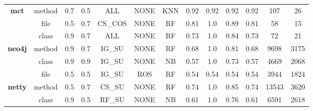 \begin{table}[H]
{\begin{tabular}{@{}ccccccccccccc@{}}
                                                         \hline
\multirow{3}{*}{\textbf{mct}}                            & method                 & 0.7        & 0.5           & ALL                      & NONE                       & KNN            & 0.92               & 0.92            & 0.92       & 0.92              & 107                & 26            \\
                                                         & file                   & 0.5        & 0.7           & CS\_COS                  & NONE                       & RF             & 0.81               & 1.0             & 0.89       & 0.81              & 58                 & 15            \\
                                                         & class                  & 0.9        & 0.7           & ALL                      & NONE                       & RF             & 0.73               & 1.0             & 0.84       & 0.73              & 72                 & 21            \\
                                                         \hline
\multirow{3}{*}{\textbf{neo4j}}                          & method                 & 0.9        & 0.7           & IG\_SU                   & NONE                       & RF             & 0.68               & 1.0             & 0.81       & 0.68              & 9698               & 3175          \\
                                                         & class                  & 0.9        & 0.9           & IG\_SU                   & NONE                       & NB             & 0.57               & 1.0             & 0.73       & 0.57              & 4669               & 2068          \\
                                                         & file                   & 0.5        & 0.5           & IG\_SU                   & ROS                        & RF             & 0.54               & 0.54            & 0.54       & 0.54              & 3944               & 1824          \\
                                                         \hline
\multirow{3}{*}{\textbf{netty}}                          & method                 & 0.5        & 0.7           & CS\_SU                   & NONE                       & RF             & 0.74               & 1.0             & 0.85       & 0.74              & 13543              & 3620          \\
                                                         & class                  & 0.9        & 0.5           & RF\_SU                   & NONE                       & NB             & 0.61               & 1.0             & 0.76       & 0.61              & 6591               & 2618          \\

\end{tabular}}
\end{table}
